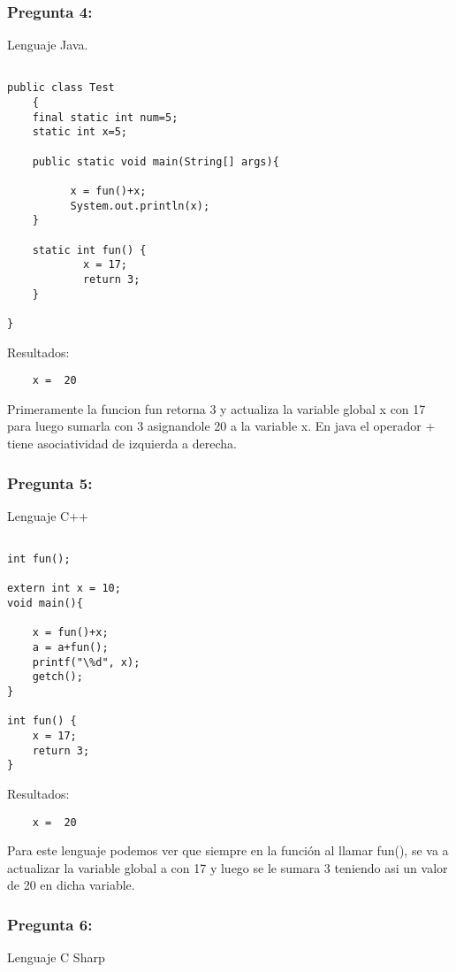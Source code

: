 \documentclass[11pt]{article}
\begin{document}
\subsubsection{Pregunta 4:}

Lenguaje Java.

\begin{lstlisting}[frame=single] 

public class Test
    {
    final static int num=5;
    static int x=5;
   
    public static void main(String[] args){
        
          x = fun()+x; 
          System.out.println(x); 
    }

    static int fun() {
            x = 17;
            return 3;
    }

}
\end{lstlisting}

\noindent Resultados:
\begin{verbatim}
	x =  20
\end{verbatim}

Primeramente la funcion fun retorna 3 y actualiza la variable global x con 17 para luego sumarla con 3 asignandole 20 a la variable x.
En java el operador + tiene asociatividad de izquierda a derecha.

\subsubsection{Pregunta 5:}

Lenguaje C++

\begin{lstlisting}[frame=single] 

int fun();

extern int x = 10;
void main(){
	
	x = fun()+x;
	a = a+fun();
	printf("\%d", x);
	getch();
}

int fun() {
	x = 17;
	return 3;
}
\end{lstlisting}

\noindent Resultados:
\begin{verbatim}
	x =  20
\end{verbatim}

Para este lenguaje podemos ver que siempre en la función al llamar fun(), se va a actualizar la variable global a con 17 y luego se le sumara 3 teniendo asi un valor de 20 en dicha variable.


\subsubsection{Pregunta 6:}
Lenguaje C Sharp
\end{document}

